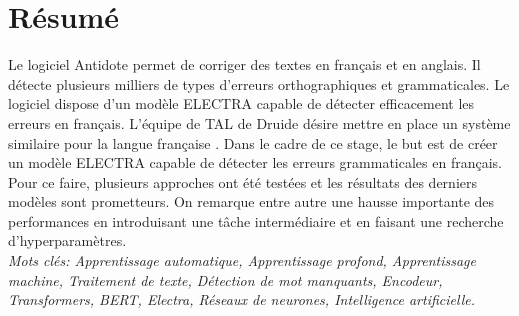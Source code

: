 \documentclass[12pt,twoside,maitrise]{dms}
\theoremstyle{definition}
\numberwithin{equation}{section}
\numberwithin{table}{chapter}
\numberwithin{figure}{chapter}
\begin{document}


\maketitle

\maketitle


\francais

\chapter*{Résumé}
Le logiciel Antidote permet de corriger des textes en français et en anglais.
Il détecte plusieurs milliers de types d’erreurs orthographiques et
grammaticales. Le logiciel dispose d'un modèle ELECTRA capable de détecter
efficacement les erreurs en français. L'équipe de TAL de Druide désire mettre
en place un système similaire pour la langue française . Dans le cadre de ce
stage, le but est de créer un modèle ELECTRA capable de détecter les erreurs
grammaticales en français. Pour ce faire, plusieurs approches ont été testées
et les résultats des derniers modèles sont prometteurs. On remarque entre autre
une hausse importante des performances en introduisant une tâche intermédiaire
et en faisant une recherche d'hyperparamètres.\\

\textit{Mots clés: Apprentissage automatique, Apprentissage profond,
Apprentissage machine, Traitement de texte, Détection de mot manquants,
Encodeur, Transformers, BERT, Electra, Réseaux de neurones, Intelligence
artificielle.}
\end{document}
